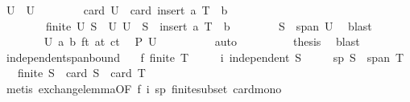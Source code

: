\begin{isabellebody}
\ U\ \ U{\isacharcolon}{\kern0pt}\isanewline
\ \ \ \ \ \ \ \ {\isachardoublequoteopen}card\ U\ {\isacharequal}{\kern0pt}\ card\ {\isacharparenleft}{\kern0pt}insert\ a\ {\isacharparenleft}{\kern0pt}T\ {\isacharminus}{\kern0pt}\ {\isacharbraceleft}{\kern0pt}b{\isacharbraceright}{\kern0pt}{\isacharparenright}{\kern0pt}{\isacharparenright}{\kern0pt}{\isachardoublequoteclose}\isanewline
\ \ \ \ \ \ \ \ {\isachardoublequoteopen}finite\ U{\isachardoublequoteclose}\ {\isachardoublequoteopen}S\ {\isasymsubseteq}\ U{\isachardoublequoteclose}\ {\isachardoublequoteopen}U\ {\isasymsubseteq}\ S\ {\isasymunion}\ insert\ a\ {\isacharparenleft}{\kern0pt}T\ {\isacharminus}{\kern0pt}\ {\isacharbraceleft}{\kern0pt}b{\isacharbraceright}{\kern0pt}{\isacharparenright}{\kern0pt}{\isachardoublequoteclose}\isanewline
\ \ \ \ \ \ \ \ {\isachardoublequoteopen}S\ {\isasymsubseteq}\ span\ U{\isachardoublequoteclose}\ \isamarkupfalse%
\ blast\isanewline
\ \ \ \ \ \ \isamarkupfalse%
\ U\ a\ b\ ft\ at\ ct{}\ \isamarkupfalse%
\ {\isachardoublequoteopen}{\isacharquery}{\kern0pt}P\ U{\isachardoublequoteclose}\isanewline
\ \ \ \ \ \ \ \ \isamarkupfalse%
\ auto\isanewline
\ \ \ \ \ \ \isamarkupfalse%
\ \isamarkupfalse%
\ {\isacharquery}{\kern0pt}thesis\ \isamarkupfalse%
\ blast\isanewline
\ \ \ \ \isamarkupfalse%
\isanewline
\ \ \isamarkupfalse%
\isanewline
{}\isamarkupfalse%
%
\endisatagproof
{\isafoldproof}%
%
\isadelimproof
\isanewline
%
\endisadelimproof
\isanewline
{}\isamarkupfalse%
\ independent{\isacharunderscore}{\kern0pt}span{\isacharunderscore}{\kern0pt}bound{\isacharcolon}{\kern0pt}\isanewline
\ \ \ f{\isacharcolon}{\kern0pt}\ {\isachardoublequoteopen}finite\ T{\isachardoublequoteclose}\isanewline
\ \ \ \ \ i{\isacharcolon}{\kern0pt}\ {\isachardoublequoteopen}independent\ S{\isachardoublequoteclose}\isanewline
\ \ \ \ \ sp{\isacharcolon}{\kern0pt}\ {\isachardoublequoteopen}S\ {\isasymsubseteq}\ span\ T{\isachardoublequoteclose}\isanewline
\ \ \ {\isachardoublequoteopen}finite\ S\ {\isasymand}\ card\ S\ {\isasymle}\ card\ T{\isachardoublequoteclose}\isanewline
%
\isadelimproof
\ \ %
\endisadelimproof
%
\isatagproof
{}\isamarkupfalse%
\ {\isacharparenleft}{\kern0pt}metis\ exchange{\isacharunderscore}{\kern0pt}lemma{\isacharbrackleft}{\kern0pt}OF\ f\ i\ sp{\isacharbrackright}{\kern0pt}\ finite{\isacharunderscore}{\kern0pt}subset\ card{\isacharunderscore}{\kern0pt}mono{\isacharparenright}{\kern0pt}%

\end{isabellebody}
